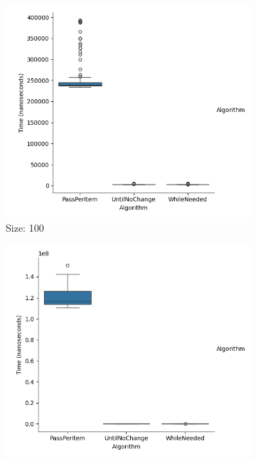 \documentclass{article}
\begin{document}
\begin{figure}[ht]
  \centering
  \begin{subfigure}{0.3\textwidth}
    \centering
    \includegraphics[width=\linewidth]{../figureStringAsc100.png}
    \caption{Size: 100}
    \label{fig:img1}
  \end{subfigure}
  \begin{subfigure}{0.3\textwidth}
    \centering
    \includegraphics[width=\linewidth]{../figureStringAsc1000.png}

\end{subfigure}
\end{figure}
\end{document}
